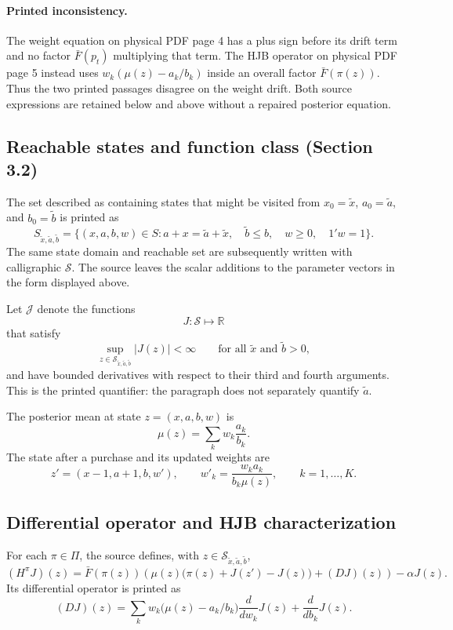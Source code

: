 \documentclass{article}
\begin{document}
\paragraph{Printed inconsistency.}
The weight equation on physical PDF page 4 has a plus sign before its drift term and no factor \(\bar F(p_t)\) multiplying that term. The HJB operator on physical PDF page 5 instead uses \(w_k(\mu(z)-a_k/b_k)\) inside an overall factor \(\bar F(\pi(z))\). Thus the two printed passages disagree on the weight drift. Both source expressions are retained below and above without a repaired posterior equation.

\subsection*{Reachable states and function class (Section 3.2)}
The set described as containing states that might be visited from
\(x_0=\tilde x\), \(a_0=\tilde a\), and \(b_0=\tilde b\) is printed as
\[
S_{\tilde x,\tilde a,\tilde b}
=\{(x,a,b,w)\in S:
 a+x=\tilde a+\tilde x,\quad
 \tilde b\leq b,\quad w\geq0,\quad 1'w=1\}.
\]
The same state domain and reachable set are subsequently written with calligraphic \(\mathcal S\). The source leaves the scalar additions to the parameter vectors in the form displayed above.

Let \(\mathcal J\) denote the functions
\[
J:\mathcal S\longmapsto\mathbb R
\]
that satisfy
\[
\sup_{z\in\mathcal S_{\tilde x,\tilde a,\tilde b}}|J(z)|<\infty
\qquad\text{for all }\tilde x\text{ and }\tilde b>0,
\]
and have bounded derivatives with respect to their third and fourth arguments. This is the printed quantifier: the paragraph does not separately quantify \(\tilde a\).

The posterior mean at state \(z=(x,a,b,w)\) is
\[
\mu(z)=\sum_k w_k\frac{a_k}{b_k}.
\]
The state after a purchase and its updated weights are
\[
z'=(x-1,a+1,b,w'),
\qquad
w'_k=\frac{w_ka_k}{b_k\mu(z)},\qquad k=1,\ldots,K.
\]

\subsection*{Differential operator and HJB characterization}
For each \(\pi\in\Pi\), the source defines, with
\(z\in\mathcal S_{\tilde x,\tilde a,\tilde b}\),
\[
(H^\pi J)(z)
=\bar F(\pi(z))\left(
\mu(z)\bigl(\pi(z)+J(z')-J(z)\bigr)+(DJ)(z)
\right)-\alpha J(z).
\]
Its differential operator is printed as
\[
(DJ)(z)=\sum_k w_k\bigl(\mu(z)-a_k/b_k\bigr)
\frac{d}{dw_k}J(z)+\frac{d}{db_k}J(z).
\]
\end{document}
